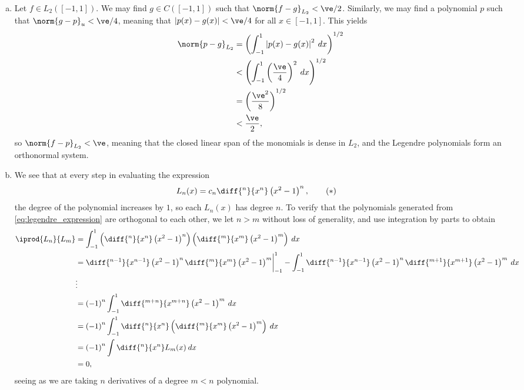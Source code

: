 \documentclass[10pt]{mypackage}
\begin{document}
\begin{enumerate}[(a)]
  \item Let $f\in L_2\left( [-1,1] \right)$. We may find $g\in C\left( [-1,1] \right)$ such that $\norm{f-g}_{L_2} < \ve/2$. Similarly, we may find a polynomial $p$ such that $\norm{g-p}_{u} < \ve/4$, meaning that $\left\vert p(x)-g(x) \right\vert < \ve/4$ for all $x\in [-1,1]$. This yields
    \begin{align*}
      \norm{p-g}_{L_2} &= \left( \int_{-1}^{1} \left\vert p(x)-g(x) \right\vert^2\:dx \right)^{1/2}\\
                       &< \left( \int_{-1}^{1} \left( \frac{\ve}{4} \right)^2\:dx \right)^{1/2}\\
                       &= \left( \frac{\ve^2}{8} \right)^{1/2}\\
                       &< \frac{\ve}{2},
    \end{align*}
    so $\norm{f-p}_{L_2} < \ve$, meaning that the closed linear span of the monomials is dense in $L_2$, and the Legendre polynomials form an orthonormal system.
  \item We see that at every step in evaluating the expression
    \begin{align*}
      L_n(x) &= c_n \diff{^{n}}{x^{n}}\left( x^2-1 \right)^{n},\label{eq:legendre_expression}\tag{$\ast$}
    \end{align*}
    the degree of the polynomial increases by $1$, so each $L_n(x)$ has degree $n$. To verify that the polynomials generated from \eqref{eq:legendre_expression} are orthogonal to each other, we let $n > m$ without loss of generality, and use integration by parts to obtain
    \begin{align*}
      \iprod{L_n}{L_m} &= \int_{-1}^{1} \left( \diff{^{n}}{x^{n}}\left( x^2-1 \right)^{n} \right) \left( \diff{^{m}}{x^{m}}\left( x^2-1 \right)^{m} \right)\:dx\\
                       &= \diff{^{n-1}}{x^{n-1}}\left( x^2-1 \right)^{n}\diff{^{m}}{x^{m}}\left( x^2-1 \right)^{m}\biggr\vert_{-1}^{1} - \int_{-1}^{1} \diff{^{n-1}}{x^{n-1}}\left( x^2-1 \right)^{n}\diff{^{m+1}}{x^{m+1}}\left( x^2-1 \right)^{m} \:dx\\
                       &\vdots\\
                       &= \left( -1 \right)^{n} \int_{-1}^{1} \diff{^{m+n}}{x^{m+n}}\left( x^2-1 \right)^{m}\:dx\\
                       &= \left( -1 \right)^{n} \int_{-1}^{1} \diff{^{n}}{x^{n}}\left( \diff{^{m}}{x^{m}}\left( x^2-1 \right)^{m} \right)\:dx\\
                       &= \left( -1 \right)^{n} \int_{}^{} \diff{^{n}}{x^{n}}L_m(x)\:dx\\
                       &= 0,
    \end{align*}
    seeing as we are taking $n$ derivatives of a degree $m < n$ polynomial.
\end{enumerate}
\end{document}
